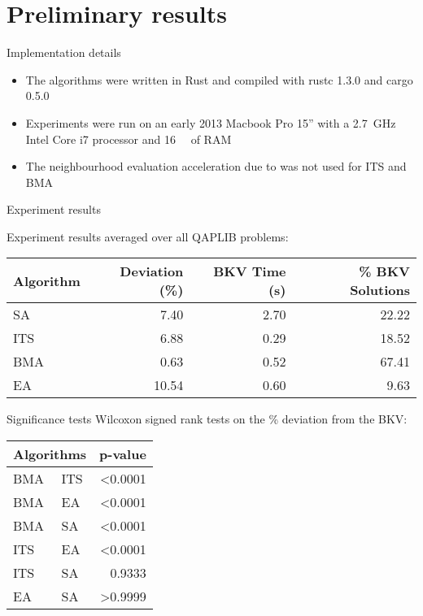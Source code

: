 \section{Preliminary results} {
    \begin{frame}{Implementation details}
        \begin{itemize}
            \item The algorithms were written in Rust and compiled with rustc 1.3.0 and cargo 0.5.0
            \item Experiments were run on an early 2013 Macbook Pro 15'' with a \SI{2.7}{\giga\hertz} Intel Core i7 processor and \SI{16}{\giga\byte} of RAM
            \item The neighbourhood evaluation acceleration due to \citet{Frieze:1989iv} was not used for ITS and BMA
        \end{itemize}
    \end{frame}

    \begin{frame}{Experiment results}

        Experiment results averaged over all QAPLIB problems:

        \begin{tabularx}{1.0\textwidth}{@{}l|rrr@{}}
            \toprule
            Algorithm & Deviation (\%) & BKV Time (s) & \% BKV Solutions \\
            \midrule
            SA  &  7.40 & 2.70 & 22.22 \\
            ITS &  6.88 & 0.29 & 18.52 \\
            BMA &  0.63 & 0.52 & 67.41 \\
            EA  & 10.54 & 0.60 &  9.63 \\
            \bottomrule
        \end{tabularx}

    \end{frame}

    \begin{frame}{Significance tests}
        Wilcoxon signed rank tests on the \% deviation from the BKV:

        \begin{tabularx}{1.0\textwidth}{@{}ll|r@{}}
            \toprule
            \multicolumn{2}{c}{Algorithms} & p-value \\
            \midrule
            BMA & ITS & <0.0001 \\
            BMA & EA  & <0.0001 \\
            BMA & SA  & <0.0001 \\
            ITS & EA  & <0.0001 \\
            ITS & SA  & 0.9333 \\
            EA  & SA  & >0.9999 \\
            \bottomrule
        \end{tabularx}
    \end{frame}

}

